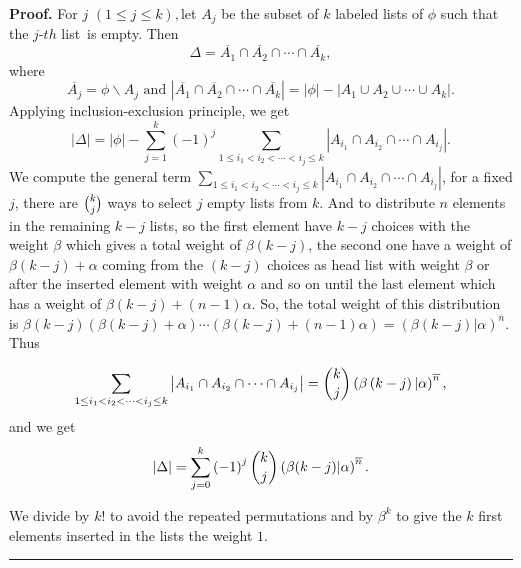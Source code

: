 \documentclass{article}
\newenvironment{proof}[1][Proof]{\noindent\textbf{#1.} }{\ \rule{0.5em}{0.5em}}
\begin{document}
\begin{proof}
For $j$ $\left( 1\leq j\leq k\right), $let $A_{j}$ be the subset of $k$
labeled lists of $\phi $ such that the $j$-$th$ list\ is empty. Then
\begin{equation*}
\Delta =\overline{A_{1}}\cap \overline{A_{2}}\cap \cdots \cap \overline{A_{k}},
\end{equation*}
where
\begin{equation*}
\overline{A_{j}}=\phi \backslash A_{j}\text{ \ and \ }\left\vert
\overline{A_{1}}\cap \overline{A_{2}}\cap \cdots \cap \overline{A_{k}}%
\right\vert =\left\vert \phi \right\vert -\left\vert A_{1}\cup A_{2}\cup
\cdots \cup A_{k}\right\vert .
\end{equation*}
Applying inclusion-exclusion principle, we get%
\begin{equation}
\left\vert \Delta \right\vert =\left\vert \phi \right\vert
-\sum_{j=1}^{k}\left( -1\right) ^{j}\sum_{1\leq i_{1}<i_{2}<\cdots
<i_{j}\leq k}\left\vert A_{i_{1}}\cap A_{i_{2}}\cap \cdots \cap
A_{i_{j}}\right\vert .
\end{equation}%
We compute the general term $\sum_{1\leq i_{1}<i_{2}<\cdots <i_{j}\leq
k}\left\vert A_{i_{1}}\cap A_{i_{2}}\cap \cdots \cap A_{i_{j}}\right\vert $,
for a fixed $j$, there are $\tbinom{k}{j}$ ways to select $j$ empty lists
from $k$. And to distribute $n$ elements in the remaining $k-j$ lists, so
the first element have $k-j$ choices with the weight $\beta $ which gives a total weight of $\beta \left( k-j\right)$,
the second one have a weight of $\beta \left( k-j\right)+\alpha $
 coming from the $\left( k-j\right) $ choices as head
list with weight $\beta $ or after the inserted element with weight $\alpha $
and so on until the last element which has a weight of $\beta \left( k-j\right)
+(n-1)\alpha $. So, the total weight of this distribution is $\beta \left(
k-j\right) \left( \beta \left( k-j\right) +\alpha \right) \cdots \left(
\beta \left( k-j\right) +(n-1)\alpha \right) =\left( \beta \left( k-j\right)
|\alpha \right) ^{\overline{n}}.$ Thus%

\begin{equation*}
\sum_{1\leq i_{1}<i_{2}<\cdots <i_{j}\leq k}\left\vert A_{i_{1}}\cap
A_{i_{2}}\cap \cdots \cap A_{i_{j}}\right\vert =\dbinom{k}{j}\left( \beta
\left( k-j\right) |\alpha \right) ^{\overline{n}},
\end{equation*}%
and we get%
\begin{equation*}
\left\vert \Delta \right\vert =\sum_{j=0}^{k}\left( -1\right) ^{j}\dbinom{k}{%
j}\left( \beta (k-j)|\alpha \right) ^{\overline{n}}.
\end{equation*}

We divide by $k!$ to avoid the repeated permutations and by $\beta ^{k}$ to
give the $k$ first elements inserted in the lists the weight $1$.
\end{proof}
\end{document}
